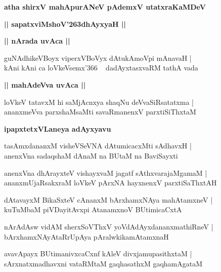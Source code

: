 \documentclass[twoside,12pt,openright]{book}
\def\S{\char'263}
\newcounter{shloka}[chapter]
\def\uvaca#1{\centerline{{\large\textbf{#1}}}}
\begin{document}
\begin{center}
{\LARGE\bfseries atha shirxV mahApurANeV pAdemxV utatxraKaMDeV}
\end{center}

\begin{center}
{\LARGE\bfseries || sapatxviMshoV\S dhAyxyaH ||}
\end{center}

\uvaca{|| nArada uvAca ||}

\begin{shloka}%
guNAdhikeVBoyx viperxVBoVyx dAtukAmoVpi mAnavaH |\\
kAni kAni ca loVkeVsemx\char'366 ~ dadAyxtasxvaRM tathA vada
\end{shloka}

\uvaca{|| mahAdeVva uvAca ||}

\begin{shloka}%
loVkeV tatavxM hi saMjAcnxya shaqNu deVvaSiRsatatxma |\\
ananxmeVva parxshaMsaMti savaRmanenxV parxtiSiThxtaM
\end{shloka}

\uvaca{ipapxtetxVLaneya adAyxyavu}

\begin{shloka}%
tasAmxdananxM visheVSeVNA dAtumicacxMti sAdhavxH |\\
anenxVna sadaqshaM dAnaM na BUtaM na BaviSayxti
\end{shloka}

\begin{shloka}%
anenxVna dhArayxteV vishayxvaM jagatf sAthxvarajaMgamaM |\\
ananxmUjaRsakxraM loVkeV pArxNA hayxnenxV parxtiSaThxtAH 
\end{shloka}

\begin{shloka}%
dAtavayxM BikaSxteV cAnanxM bArxhamxNAya mahAtamxneV |\\
kuTuMbaM piVDayitAvxpi AtanamxnoV BUtimicaCxtA
\end{shloka}

\begin{shloka}%
nArAdAsw vidAM sherxSoVThxV yoVdAdAyxdananxmathiRneV |\\
bArxhamxNAyAtaRrUpAya pAralwkikamAtamxnaH
\end{shloka}

\begin{shloka}%
avavApayx BUtimanivxcaCxnf kAleV divxjamupasithxtaM |\\
sArxnatxmadhavxni vataRMtaM gaqhasathxM gaqhamAgataM
\end{shloka}
\end{document}
